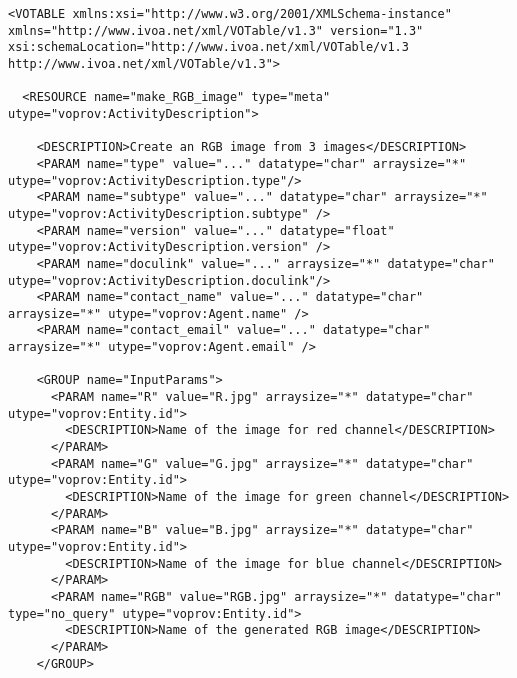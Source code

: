 \begin{verbatim}
<VOTABLE xmlns:xsi="http://www.w3.org/2001/XMLSchema-instance" xmlns="http://www.ivoa.net/xml/VOTable/v1.3" version="1.3" xsi:schemaLocation="http://www.ivoa.net/xml/VOTable/v1.3 http://www.ivoa.net/xml/VOTable/v1.3">
    
  <RESOURCE name="make_RGB_image" type="meta" utype="voprov:ActivityDescription">
      
    <DESCRIPTION>Create an RGB image from 3 images</DESCRIPTION>
    <PARAM name="type" value="..." datatype="char" arraysize="*" utype="voprov:ActivityDescription.type"/>
    <PARAM name="subtype" value="..." datatype="char" arraysize="*" utype="voprov:ActivityDescription.subtype" />
    <PARAM name="version" value="..." datatype="float" utype="voprov:ActivityDescription.version" />
    <PARAM name="doculink" value="..." arraysize="*" datatype="char" utype="voprov:ActivityDescription.doculink"/>
    <PARAM name="contact_name" value="..." datatype="char" arraysize="*" utype="voprov:Agent.name" />
    <PARAM name="contact_email" value="..." datatype="char" arraysize="*" utype="voprov:Agent.email" />
        
    <GROUP name="InputParams">
      <PARAM name="R" value="R.jpg" arraysize="*" datatype="char" utype="voprov:Entity.id">
        <DESCRIPTION>Name of the image for red channel</DESCRIPTION>
      </PARAM>
      <PARAM name="G" value="G.jpg" arraysize="*" datatype="char" utype="voprov:Entity.id">
        <DESCRIPTION>Name of the image for green channel</DESCRIPTION>
      </PARAM>
      <PARAM name="B" value="B.jpg" arraysize="*" datatype="char" utype="voprov:Entity.id">
        <DESCRIPTION>Name of the image for blue channel</DESCRIPTION>
      </PARAM>
      <PARAM name="RGB" value="RGB.jpg" arraysize="*" datatype="char" type="no_query" utype="voprov:Entity.id">
        <DESCRIPTION>Name of the generated RGB image</DESCRIPTION>
      </PARAM>
    </GROUP>
		

\end{verbatim}
